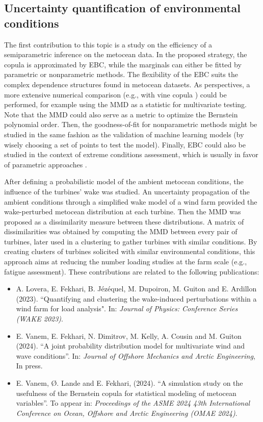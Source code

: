 \subsection*{Uncertainty quantification of environmental conditions}
The first contribution to this topic is a study on the efficiency of a semiparametric inference on the metocean data. 
In the proposed strategy, the copula is approximated by EBC, while the marginals can either be fitted by parametric or nonparametric methods.   
The flexibility of the EBC suits the complex dependence structures found in metocean datasets. 
As perspectives, a more extensive numerical comparison (e.g., with vine copula \citealp{vanem_2016,lin_2019_cvines_waves}) could be performed, for example using the MMD as a statistic for multivariate testing. 
Note that the MMD could also serve as a metric to optimize the Bernstein polynomial order. 
Then, the goodness-of-fit for nonparametric methods might be studied in the same fashion as the validation of machine learning models (by wisely choosing a set of points to test the model).
Finally, EBC could also be studied in the context of extreme conditions assessment, which is usually in favor of parametric approaches \citep{vanem_fekhari_2024}. 

After defining a probabilistic model of the ambient metocean conditions, the influence of the turbines' wake was studied. 
An uncertainty propagation of the ambient conditions through a simplified wake model of a wind farm provided the wake-perturbed metocean distribution at each turbine.  
Then the MMD was proposed as a dissimilarity measure between these distributions. 
A matrix of dissimilarities was obtained by computing the MMD between every pair of turbines, later used in a clustering to gather turbines with similar conditions.  
By creating clusters of turbines solicited with similar environmental conditions, this approach aims at reducing the number loading studies at the farm scale (e.g., fatigue assessment).
These contributions are related to the following publications:
\begin{itemize}
    \footnotesize
    \item[\ding{125}] A. Lovera, E. Fekhari, B. Jézéquel, M. Dupoiron, M. Guiton and E. Ardillon (2023). ``Quantifying and clustering the wake-induced perturbations within a wind farm for load analysis". In: \textit{Journal of Physics: Conference Series (WAKE 2023)}.
    \item[\ding{125}] E. Vanem, E. Fekhari, N. Dimitrov, M. Kelly, A. Cousin and M. Guiton (2024). ``A joint probability distribution model for multivariate wind and wave conditions''. In: \textit{Journal of Offshore Mechanics and Arctic Engineering}, In press. 
    \item[\ding{125}] E. Vanem, \O{}. Lande and E. Fekhari, (2024). ``A simulation study on the usefulness of the Bernstein copula for statistical modeling of metocean variables''. To appear in: \textit{Proceedings of the ASME 2024 43th International Conference on Ocean, Offshore and Arctic Engineering (OMAE 2024)}.
\end{itemize}

